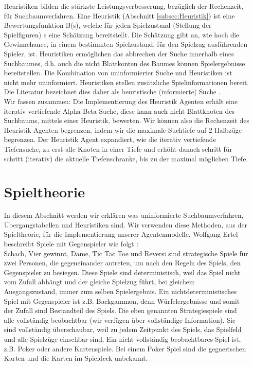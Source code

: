 Heuristiken bilden die stärkste Leistungsverbesserung, bezüglich der Rechenzeit, für Suchbaumverfahren. Eine Heuristik (Abschnitt \ref{subsec:Heuristik}) ist eine Bewertungsfunktion B(s), welche für jeden Spielzustand (Stellung der Spielfiguren) s eine Schätzung bereitstellt. Die Schätzung gibt an, wie hoch die Gewinnchance, in einem bestimmten Spielzustand, für den Spielzug ausführenden Spieler, ist. Heuristiken ermöglichen das abbrechen der Suche innerhalb eines Suchbaumes, d.h. auch die nicht Blattkonten des Baumes können Spielergebnisse bereitstellen. Die Kombination von uninformierter Suche und Heuristiken ist nicht mehr uninformiert. Heuristiken stellen zusätzliche Spielinformationen bereit. Die Literatur bezeichnet dies daher als heuristische (informierte) Suche \cite[105]{Ertel}. \\

Wir fassen zusammen: Die Implementierung des Heuristik Agenten erhält eine iterativ vertiefende Alpha-Beta Suche, diese kann auch nicht Blattknoten des Suchbaums, mittels einer Heuristik, bewerten. Wir können also die Rechenzeit des Heuristik Agenten begrenzen, indem wir die maximale Suchtiefe auf 2 Halbzüge begrenzen. Der Heuristik Agent expandiert, wie die iterativ vertiefende Tiefensuche, zu erst alle Knoten in einer Tiefe und erhöht danach schritt für schritt (iterativ) die aktuelle Tiefenschranke, bis zu der maximal möglichen Tiefe. 

\section{Spieltheorie}
\label{sec:Spieltheorie}
In diesem Abschnitt werden wir erklären was uninformierte Suchbaumverfahren, Übergangstabellen und Heuristiken sind. Wir verwenden diese Methoden, aus der Spieltheorie, für die Implementierung unserer Agentenmodelle. Wolfgang Ertel beschreibt Spiele mit Gegenspieler wie folgt \cite[114]{Ertel}: \\ 

Schach, Vier gewinnt, Dame, Tic Tac Toe und Reversi sind strategische Spiele für zwei Personen, die gegeneinander antreten, um nach den Regeln des Spiels, den Gegenspieler zu besiegen. Diese Spiele sind deterministisch, weil das Spiel nicht vom Zufall abhängt und der gleiche Spielzug führt, bei gleichem Ausgangszustand, immer zum selben Spielergebnis. Ein nichtdeterministisches Spiel mit Gegenspieler ist z.B. Backgammon, denn Würfelergebnisse und somit der Zufall sind Bestandteil des Spiels. Die eben genannten Strategiespiele sind alle vollständig beobachtbar (wir verfügen über vollständige Information). Sie sind vollständig überschaubar, weil zu jedem Zeitpunkt des Spiels, das Spielfeld und alle Spielzüge einsehbar sind. Ein nicht vollständig beobachtbares Spiel ist, z.B. Poker oder andere Kartenspiele. Bei einem Poker Spiel sind die gegnerischen Karten und die Karten im Spieldeck unbekannt.\\

